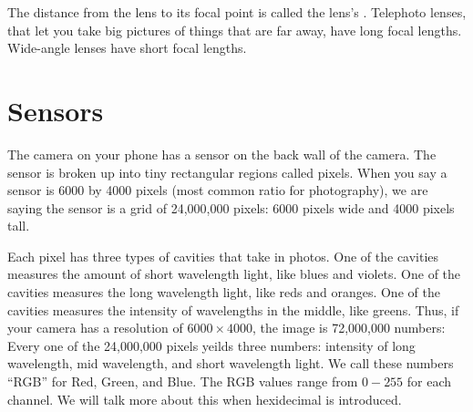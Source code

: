 The distance from the lens to its focal point is called the lens's
. Telephoto lenses, that let you take big
pictures of things that are far away, have long focal lengths.
Wide-angle lenses have short focal lengths.

\section{Sensors}

The camera on your phone has a sensor on the back wall of the
camera. The sensor is broken up into tiny rectangular regions called
pixels. When you say a sensor is 6000 by 4000 pixels (most common ratio for photography), we are saying
the sensor is a grid of 24,000,000 pixels: 6000 pixels wide and
4000 pixels tall.

Each pixel has three types of cavities that take in photos. One of the
cavities measures the amount of short wavelength light, like blues and
violets. One of the cavities measures the long wavelength light, like
reds and oranges. One of the cavities measures the intensity of
wavelengths in the middle, like greens.
Thus, if your camera has a resolution of $6000 \times 4000$, the image
is 72,000,000 numbers: Every one of the 24,000,000 pixels yeilds three
numbers: intensity of long wavelength, mid wavelength, and short
wavelength light. We call these numbers ``RGB'' for Red, Green, and
Blue. The RGB values range from $0-255$ for each channel. We will talk more about this when hexidecimal is introduced.  

